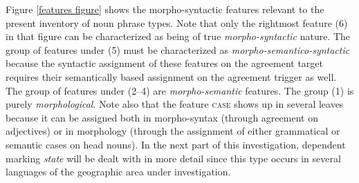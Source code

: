 Figure \ref{features figure} shows the morpho-syntactic features relevant to the present inventory of noun phrase types. Note that only the rightmost feature (6) in that figure can be characterized as being of true \emph{morpho-syntactic} nature. The group of features under (5) must be characterized as \emph{morpho-semantico-syntactic} because the syntactic assignment of these features on the agreement target requires their semantically based assignment on the agreement trigger as well. The group of features under (2–4) are \emph{morpho-semantic} features. The group (1) is purely \emph{morphological}. Note also that the feature \textsc{case} shows up in several leaves because  it can be assigned both in morpho-syntax (through agreement on adjectives) or in morphology (through the assignment of either grammatical or semantic cases on head nouns). 
In the next part of this investigation, dependent marking \emph{state} will be dealt with in more detail since this type occurs in several languages of the geographic area under investigation.

%